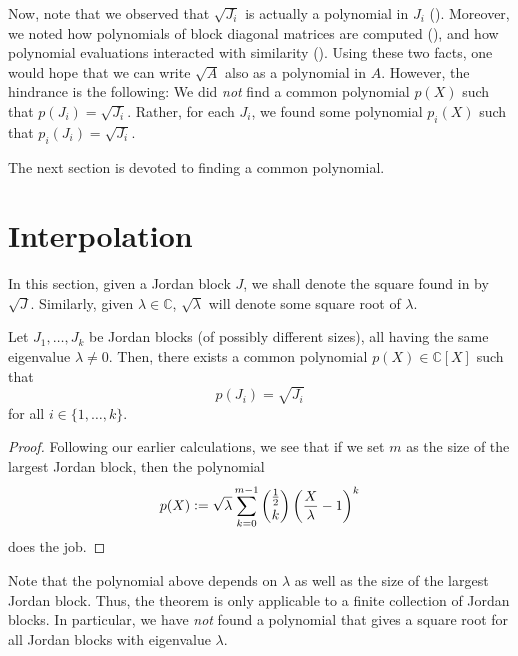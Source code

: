 \documentclass[12pt]{article}
\begin{document}
Now, note that we observed that $\sqrt{J_{i}}$ is actually a polynomial in $J_{i}$ (). Moreover, we noted how polynomials of block diagonal matrices are computed (), and how polynomial evaluations interacted with similarity (). Using these two facts, one would hope that we can write $\sqrt{A}$ also as a polynomial in $A$. \newline
However, the hindrance is the following: We did \emph{not} find a common polynomial $p(X)$ such that $p(J_{i}) = \sqrt{J_{i}}$. Rather, for each $J_{i}$, we found some polynomial $p_{i}(X)$ such that $p_{i}(J_{i}) = \sqrt{J_{i}}$. 

The next section is devoted to finding a common polynomial.

\section{Interpolation}

In this section, given a Jordan block $J$, we shall denote the square found in  by $\sqrt{J}$. Similarly, given $\lambda \in \mathbb{C}$, $\sqrt{\lambda}$ will denote some square root of $\lambda$.

\begin{thm} \label{thm:common-polynomial-same-eigenvalue}
	Let $J_{1}, \ldots, J_{k}$ be Jordan blocks (of possibly different sizes), all having the same eigenvalue $\lambda \neq 0$. Then, there exists a common polynomial $p(X) \in \mathbb{C}[X]$ such that
	\begin{equation*} 
		p(J_{i}) = \sqrt{J_{i}}
	\end{equation*}
	for all $i \in \{1, \ldots, k\}$. 
\end{thm}
\begin{proof} 
	Following our earlier calculations, we see that if we set $m$ as the size of the largest Jordan block, then the polynomial
	\begin{equation*} 
		p(X) \vcentcolon= \sqrt{\lambda} \sum_{k = 0}^{m - 1} \binom{\frac{1}{2}}{k} \left(\frac{X}{\lambda} - 1\right)^{k}
	\end{equation*}
	does the job.
\end{proof}

\begin{rem}
	Note that the polynomial above depends on $\lambda$ as well as the size of the largest Jordan block. Thus, the theorem is only applicable to a finite collection of Jordan blocks. In particular, we have \emph{not} found a polynomial that gives a square root for all Jordan blocks with eigenvalue $\lambda$.
\end{rem}
\end{document}
